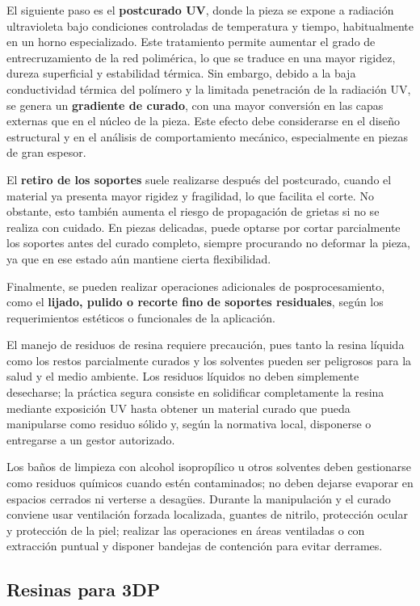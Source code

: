 El siguiente paso es el \textbf{postcurado UV}, donde la pieza se expone a radiación ultravioleta bajo condiciones controladas de temperatura y tiempo, habitualmente en un horno especializado. Este tratamiento permite aumentar el grado de entrecruzamiento de la red polimérica, lo que se traduce en una mayor rigidez, dureza superficial y estabilidad térmica. Sin embargo, debido a la baja conductividad térmica del polímero y la limitada penetración de la radiación UV, se genera un \textbf{gradiente de curado}, con una mayor conversión en las capas externas que en el núcleo de la pieza. Este efecto debe considerarse en el diseño estructural y en el análisis de comportamiento mecánico, especialmente en piezas de gran espesor.

El \textbf{retiro de los soportes} suele realizarse después del postcurado, cuando el material ya presenta mayor rigidez y fragilidad, lo que facilita el corte. No obstante, esto también aumenta el riesgo de propagación de grietas si no se realiza con cuidado. En piezas delicadas, puede optarse por cortar parcialmente los soportes antes del curado completo, siempre procurando no deformar la pieza, ya que en ese estado aún mantiene cierta flexibilidad.

Finalmente, se pueden realizar operaciones adicionales de posprocesamiento, como el \textbf{lijado, pulido o recorte fino de soportes residuales}, según los requerimientos estéticos o funcionales de la aplicación.

El manejo de residuos de resina requiere precaución, pues tanto la resina líquida como los restos parcialmente curados y los solventes pueden ser peligrosos para la salud y el medio ambiente. Los residuos líquidos no deben simplemente desecharse; la práctica segura consiste en solidificar completamente la resina mediante exposición UV hasta obtener un material curado que pueda manipularse como residuo sólido y, según la normativa local, disponerse o entregarse a un gestor autorizado.

Los baños de limpieza con alcohol isopropílico u otros solventes deben gestionarse como residuos químicos cuando estén contaminados; no deben dejarse evaporar en espacios cerrados ni verterse a desagües. Durante la manipulación y el curado conviene usar ventilación forzada localizada, guantes de nitrilo, protección ocular y protección de la piel; realizar las operaciones en áreas ventiladas o con extracción puntual y disponer bandejas de contención para evitar derrames.

\subsection{Resinas para 3DP}

